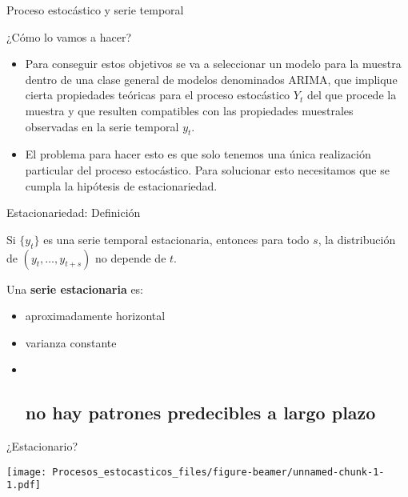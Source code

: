 \documentclass[ignorenonframetext,]{beamer}
\begin{document}
\begin{frame}{Proceso estocástico y serie temporal}

\begin{block}{¿Cómo lo vamos a hacer?}

\begin{itemize}
\item
  Para conseguir estos objetivos se va a seleccionar un modelo para la
  muestra dentro de una clase general de modelos denominados ARIMA, que
  implique cierta propiedades teóricas para el proceso estocástico
  \(Y_t\) del que procede la muestra y que resulten compatibles con las
  propiedades muestrales observadas en la serie temporal \(y_t\).
\item
  El problema para hacer esto es que solo tenemos una única realización
  particular del proceso estocástico. Para solucionar esto necesitamos
  que se cumpla la hipótesis de estacionariedad.
\end{itemize}

\end{block}

\end{frame}

\begin{frame}{Estacionariedad: Definición}

Si \(\{y_t\}\) es una serie temporal estacionaria, entonces para todo
\(s\), la distribución de \((y_t,\dots,y_{t+s})\) no depende de \(t\).

Una \textbf{serie estacionaria} es:

\begin{itemize}
\item
  aproximadamente horizontal
\item
  varianza constante
\item ~
  \subsection{no hay patrones predecibles a largo
  plazo}\label{no-hay-patrones-predecibles-a-largo-plazo}
\end{itemize}

\end{frame}

\begin{frame}{¿Estacionario?}

\texttt{[image: Procesos\_estocasticos\_files/figure-beamer/unnamed-chunk-1-1.pdf]}

\end{frame}
\end{document}
